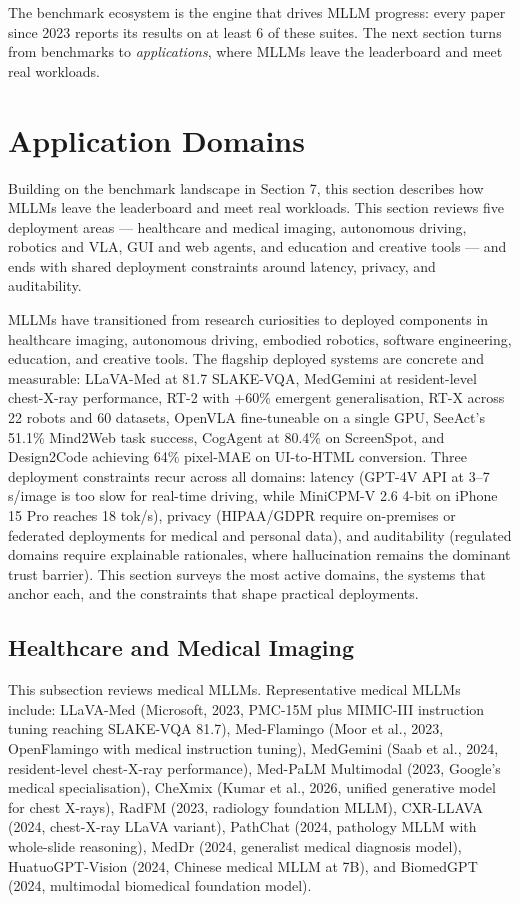 \documentclass{article}
\begin{document}
The benchmark ecosystem is the engine that drives MLLM progress: every paper since 2023 reports its results on at least 6 of these suites. The next section turns from benchmarks to \emph{applications}, where MLLMs leave the leaderboard and meet real workloads.

\section{Application Domains}\label{application-domains}

Building on the benchmark landscape in Section 7, this section describes how MLLMs leave the leaderboard and meet real workloads. This section reviews five deployment areas --- healthcare and medical imaging, autonomous driving, robotics and VLA, GUI and web agents, and education and creative tools --- and ends with shared deployment constraints around latency, privacy, and auditability.

MLLMs have transitioned from research curiosities to deployed components in healthcare imaging, autonomous driving, embodied robotics, software engineering, education, and creative tools. The flagship deployed systems are concrete and measurable: LLaVA-Med at 81.7 SLAKE-VQA, MedGemini at resident-level chest-X-ray performance, RT-2 with +60\% emergent generalisation, RT-X across 22 robots and 60 datasets, OpenVLA fine-tuneable on a single GPU, SeeAct's 51.1\% Mind2Web task success, CogAgent at 80.4\% on ScreenSpot, and Design2Code achieving 64\% pixel-MAE on UI-to-HTML conversion. Three deployment constraints recur across all domains: latency (GPT-4V API at 3--7 s/image is too slow for real-time driving, while MiniCPM-V 2.6 4-bit on iPhone 15 Pro reaches 18 tok/s), privacy (HIPAA/GDPR require on-premises or federated deployments for medical and personal data), and auditability (regulated domains require explainable rationales, where hallucination remains the dominant trust barrier). This section surveys the most active domains, the systems that anchor each, and the constraints that shape practical deployments.

\subsection{Healthcare and Medical Imaging}\label{healthcare-and-medical-imaging}

This subsection reviews medical MLLMs. Representative medical MLLMs include: LLaVA-Med (Microsoft, 2023, PMC-15M plus MIMIC-III instruction tuning reaching SLAKE-VQA 81.7), Med-Flamingo (Moor et al., 2023, OpenFlamingo with medical instruction tuning), MedGemini (Saab et al., 2024, resident-level chest-X-ray performance), Med-PaLM Multimodal (2023, Google's medical specialisation), CheXmix (Kumar et al., 2026, unified generative model for chest X-rays), RadFM (2023, radiology foundation MLLM), CXR-LLAVA (2024, chest-X-ray LLaVA variant), PathChat (2024, pathology MLLM with whole-slide reasoning), MedDr (2024, generalist medical diagnosis model), HuatuoGPT-Vision (2024, Chinese medical MLLM at 7B), and BiomedGPT (2024, multimodal biomedical foundation model).
\end{document}
